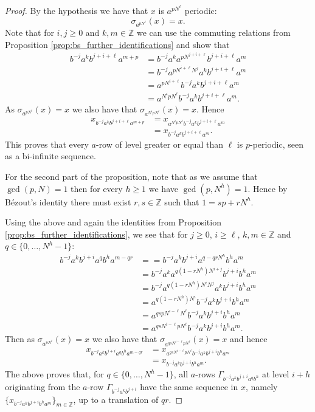 \documentclass[letterpaper,10pt]{amsart}
\theoremstyle{plain}
\begin{document}
	\begin{proof}
		By the hypothesis we have that $x$ is $a^{pN^\ell}$ periodic: 
		$$\sigma_{a^{pN^\ell}}(x)=x.$$
		Note that for $i,j\ge 0$ and $k,m\in \mathbb{Z}$ we can use the commuting relations from Proposition \ref{prop:bs_further_identifications} and show that
		\begin{align*}
		b^{-j}a^kb^{j+i+\ell}a^{m+p}&=b^{-j}a^ka^{pN^{j+i+\ell}}b^{j+i+\ell}a^{m}\\
		&=b^{-j}a^{pN^{i+\ell}N^j}a^{k}b^{j+i+\ell}a^{m}\\
		&=a^{pN^{i+\ell}}b^{-j}a^{k}b^{j+i+\ell}a^{m}\\
		&=a^{N^{i}pN^{\ell}}b^{-j}a^{k}b^{j+i+\ell}a^{m}.
		\end{align*}
		As $\sigma_{a^{pN^{\ell}}}(x)=x$ we also have that $\sigma_{a^{N^{i}pN^{\ell}}}(x)=x$. Hence
		\begin{align*}
		x_{b^{-j}a^kb^{j+i+\ell}a^{m+p}}&=x_{a^{N^{i}pN^{\ell}}b^{-j}a^{k}b^{j+i+\ell}a^{m}}\\
		&=x_{b^{-j}a^{k}b^{j+i+\ell}a^{m}}.
		\end{align*}
		This proves that every $a$-row of level greater or equal than $\ell$ is $p$-periodic, seen as a bi-infinite sequence.
		
		
		For the second part of the proposition, note that as we assume that $\gcd(p,N)=1$ then for every $h\ge 1$ we have $\gcd(p,N^h)=1$. Hence by Bézout's identity there must exist $r,s\in \mathbb{Z}$ such that $1=sp+rN^h$. 
		
		
		Using the above and again the identities from Proposition \ref{prop:bs_further_identifications}, we see that for $j\ge 0$, $i\ge \ell$, $k,m\in \mathbb{Z}$ and $q\in \{0,\ldots,N^h-1\}$:
		\begin{align*}
		b^{-j}a^{k}b^{j+i}a^{q}b^{h}a^{m-qr}&==b^{-j}a^{k}b^{j+i}a^{q-qrN^h}b^{h}a^{m}\\
		&=b^{-j}a^{k}a^{q(1-rN^{h})N^{i+j}}b^{j+i}b^{h}a^{m}\\
		&=b^{-j}a^{q(1-rN^{h})N^{i}N^{j}}a^{k}b^{j+i}b^{h}a^{m}\\	
		&=a^{q(1-rN^{h})N^{i}}b^{-j}a^{k}b^{j+i}b^{h}a^{m}\\
		&=a^{qspN^{i-\ell}N^{\ell}}b^{-j}a^{k}b^{j+i}b^{h}a^{m}\\
		&=a^{qsN^{i-\ell}pN^{\ell}}b^{-j}a^{k}b^{j+i}b^{h}a^{m}.				
		\end{align*}
		Then as $\sigma_{a^{pN^\ell}}(x)=x$ we also have that $\sigma_{a^{qsN^{i-\ell}pN^{\ell}}}(x)=x$ and hence
		\begin{align*}
		x_{b^{-j}a^{k}b^{j+i}a^{q}b^{h}a^{m-qr}}&=x_{a^{qsN^{i-\ell}pN^{\ell}}b^{-j}a^{k}b^{j+i}b^{h}a^{m}}\\
		&=x_{b^{-j}a^{k}b^{j+i}b^{h}a^{m}}.
		\end{align*}
		The above proves that, for $q\in \{0,\ldots,N^h-1\}$, all $a$-rows $\Gamma_{b^{-j}a^kb^{j+i}a^qb^h}$ at level $i+h$ originating from the $a$-row $\Gamma_{b^{-j}a^kb^{j+i}}$ have the same sequence in $x$, namely $\{x_{b^{-j}a^{k}b^{j+i}b^{h}a^{m}}\}_{m\in \mathbb{Z}}$, up to a translation of $qr$.
	\end{proof}
	
\end{document}
